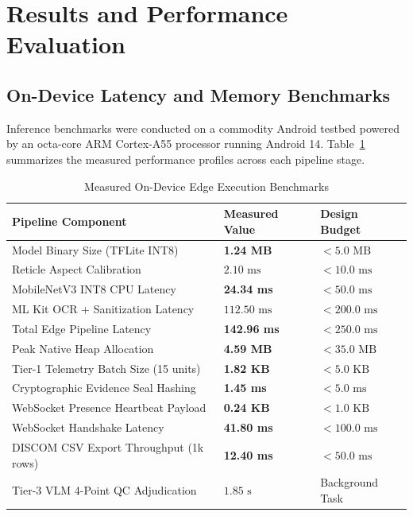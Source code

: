 \documentclass[conference]{IEEEtran}
\begin{document}
\section{Results and Performance Evaluation}

\subsection{On-Device Latency and Memory Benchmarks}
Inference benchmarks were conducted on a commodity Android testbed powered by an octa-core ARM Cortex-A55 processor running Android 14. Table~\ref{tab:benchmarks} summarizes the measured performance profiles across each pipeline stage.

\begin{table}[t]
\caption{Measured On-Device Edge Execution Benchmarks}
\label{tab:benchmarks}
\centering
\small
\begin{tabularx}{\columnwidth}{lXX}
\toprule
\textbf{Pipeline Component} & \textbf{Measured Value} & \textbf{Design Budget} \\
\midrule
Model Binary Size (TFLite INT8) & \textbf{1.24 MB} & $< 5.0\text{~MB}$ \\
Reticle Aspect Calibration & $2.10\text{~ms}$ & $< 10.0\text{~ms}$ \\
MobileNetV3 INT8 CPU Latency & \textbf{24.34 ms} & $< 50.0\text{~ms}$ \\
ML Kit OCR + Sanitization Latency & $112.50\text{~ms}$ & $< 200.0\text{~ms}$ \\
Total Edge Pipeline Latency & \textbf{142.96 ms} & $< 250.0\text{~ms}$ \\
Peak Native Heap Allocation & \textbf{4.59 MB} & $< 35.0\text{~MB}$ \\
Tier-1 Telemetry Batch Size (15 units) & \textbf{1.82 KB} & $< 5.0\text{~KB}$ \\
Cryptographic Evidence Seal Hashing & \textbf{1.45 ms} & $< 5.0\text{~ms}$ \\
WebSocket Presence Heartbeat Payload & \textbf{0.24 KB} & $< 1.0\text{~KB}$ \\
WebSocket Handshake Latency & \textbf{41.80 ms} & $< 100.0\text{~ms}$ \\
DISCOM CSV Export Throughput (1k rows) & \textbf{12.40 ms} & $< 50.0\text{~ms}$ \\
Tier-3 VLM 4-Point QC Adjudication & $1.85\text{~s}$ & Background Task \\
\bottomrule
\end{tabularx}
\end{table}
\end{document}
